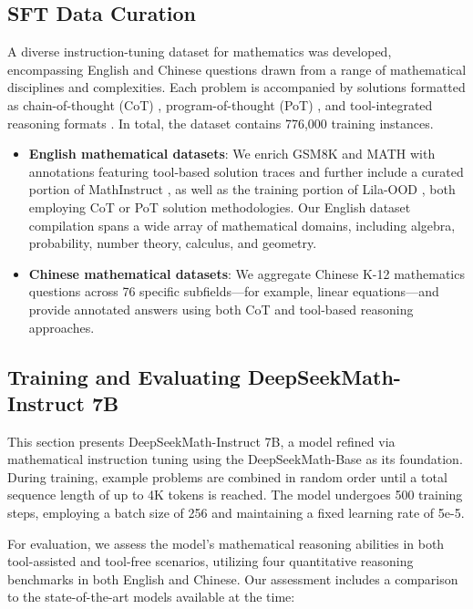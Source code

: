 \begin{itemize}[topsep=0pt]
\subsection{SFT Data Curation}

A diverse instruction-tuning dataset for mathematics was developed, encompassing English and Chinese questions drawn from a range of mathematical disciplines and complexities. Each problem is accompanied by solutions formatted as chain-of-thought (CoT) \citep{cot}, program-of-thought (PoT) \citep{pot,pal}, and tool-integrated reasoning formats \citep{tora}. In total, the dataset contains 776,000 training instances.

\begin{itemize}[topsep=0pt]
    \item \textbf{English mathematical datasets}: We enrich GSM8K and MATH with annotations featuring tool-based solution traces and further include a curated portion of MathInstruct \citep{MathInstruct}, as well as the training portion of Lila-OOD \citep{lila}, both employing CoT or PoT solution methodologies. Our English dataset compilation spans a wide array of mathematical domains, including algebra, probability, number theory, calculus, and geometry.
    \item \textbf{Chinese mathematical datasets}: We aggregate Chinese K-12 mathematics questions across 76 specific subfields—for example, linear equations—and provide annotated answers using both CoT and tool-based reasoning approaches.
\end{itemize}

\subsection{Training and Evaluating DeepSeekMath-Instruct 7B}

This section presents DeepSeekMath-Instruct 7B, a model refined via mathematical instruction tuning using the DeepSeekMath-Base as its foundation. During training, example problems are combined in random order until a total sequence length of up to 4K tokens is reached. The model undergoes 500 training steps, employing a batch size of 256 and maintaining a fixed learning rate of 5e-5.

For evaluation, we assess the model’s mathematical reasoning abilities in both tool-assisted and tool-free scenarios, utilizing four quantitative reasoning benchmarks in both English and Chinese. Our assessment includes a comparison to the state-of-the-art models available at the time:


\end{itemize}

